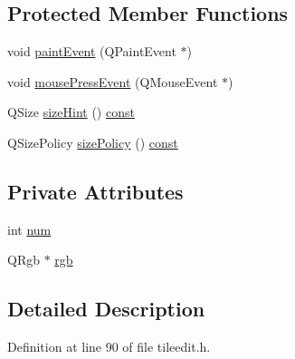 \subsection*{Protected Member Functions}
\begin{DoxyCompactItemize}
\item 
void \hyperlink{classTilePalette_a2a2088be0920bc838f15140fba58300c}{paint\+Event} (Q\+Paint\+Event $\ast$)
\item 
void \hyperlink{classTilePalette_ab98e8e073700bf21aa7c52cc4b25d318}{mouse\+Press\+Event} (Q\+Mouse\+Event $\ast$)
\item 
Q\+Size \hyperlink{classTilePalette_addb6fb9ee841fa3f33fc52e7ff8d05b4}{size\+Hint} () \hyperlink{tradstdc_8h_a2c212835823e3c54a8ab6d95c652660e}{const} 
\item 
Q\+Size\+Policy \hyperlink{classTilePalette_a5ea20eeed320ccd9b9d5d43e400310e6}{size\+Policy} () \hyperlink{tradstdc_8h_a2c212835823e3c54a8ab6d95c652660e}{const} 
\end{DoxyCompactItemize}
\subsection*{Private Attributes}
\begin{DoxyCompactItemize}
\item 
int \hyperlink{classTilePalette_a9df072a949a4814338bc2114e7bddca8}{num}
\item 
Q\+Rgb $\ast$ \hyperlink{classTilePalette_ac0a6f2a8f16c9eb83862a89fce06b89e}{rgb}
\end{DoxyCompactItemize}


\subsection{Detailed Description}


Definition at line 90 of file tileedit.\+h.



